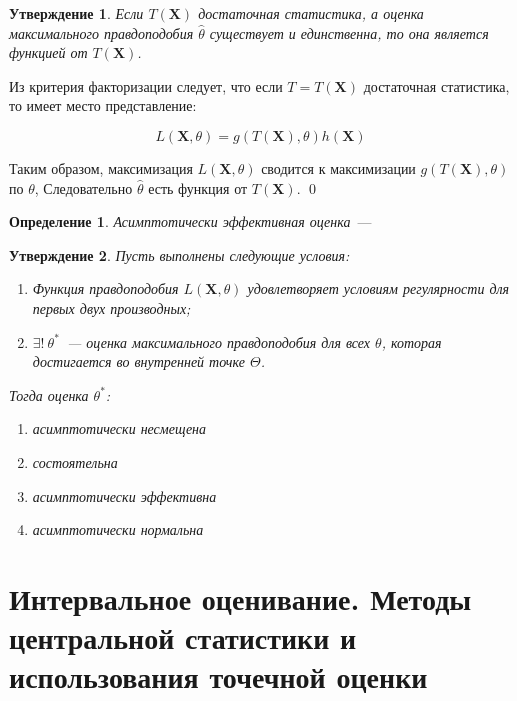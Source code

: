 \documentclass[oneside,final,14pt]{extreport}
\renewenvironment{proof}{{\bfseries Доказательство.}}{\qed}
\theoremstyle{plain}
\newtheorem*{thm*}{Утверждение}
\theoremstyle{definition}
\newtheorem*{defn}{Определение}
\theoremstyle{named}
\begin{document}
\begin{thm*}
Если $T(\mathbf{X})$ достаточная статистика, а оценка максимального правдоподобия $\hat{\theta}$ существует и единственна, то она является функцией от $T(\mathbf{X})$.
\end{thm*}

\begin{proof}
Из критерия факторизации следует, что если $T=T(\mathbf{X})$ достаточная статистика, то имеет место представление:

\begin{equation*}
    L(\mathbf{X}, \theta)=g(T(\mathbf{X}), \theta) h(\mathbf{X})
\end{equation*}

Таким образом, максимизация $L(\mathbf{X},\theta)$ сводится к максимизации $g(T(\mathbf{X}), \theta)$ по $\theta$, Следовательно $\hat{\theta}$ есть функция от $T(\mathbf{X})$.
\end{proof}

\begin{defn}
    {\it Асимптотически эффективная оценка}~---
\end{defn}

\begin{thm*}
    Пусть выполнены следующие условия:
    \begin{enumerate}
        \item Функция правдоподобия $L(\mathbf{X}, \theta)$ удовлетворяет условиям регулярности для первых двух производных;
        \item $\exists!~ \theta^{*}$~--- оценка максимального правдоподобия для всех $\theta$, которая достигается во внутренней точке $\Theta$.
    \end{enumerate}
    Тогда оценка $\theta^{*}$:
    \begin{enumerate}
        \item асимптотически несмещена
        \item состоятельна
        \item асимптотически эффективна
        \item асимптотически нормальна
    \end{enumerate}
\end{thm*}

\section{Интервальное оценивание. Методы центральной статистики и использования точечной оценки}
\end{document}
